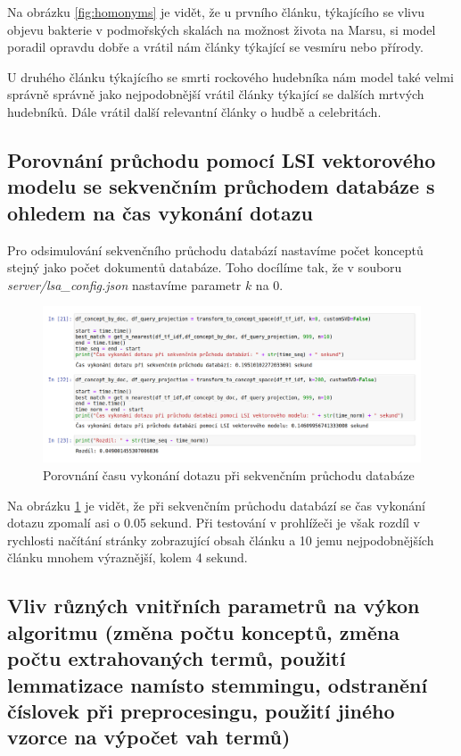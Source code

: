 \documentclass[11pt]{scrartcl} %
\begin{document}
Na obrázku \ref{fig:homonyms} je vidět, že u prvního článku, týkajícího se vlivu objevu bakterie v podmořských skalách na možnost života na Marsu, si model poradil opravdu dobře a vrátil nám články týkající se vesmíru nebo přírody.
\bigskip

U druhého článku týkajícího se smrti rockového hudebníka nám model také velmi správně správně jako nejpodobnější vrátil články týkající se dalších mrtvých hudebníků. Dále vrátil další relevantní články o hudbě a celebritách.

\subsection{Porovnání průchodu pomocí LSI vektorového modelu se sekvenčním průchodem databáze s ohledem na čas vykonání dotazu}

Pro odsimulování sekvenčního průchodu databází nastavíme počet konceptů stejný jako počet dokumentů databáze. Toho docílíme tak, že v souboru \emph{server/lsa\_config.json} nastavíme parametr $k$ na 0.

\begin{figure}[h] %
	\centering
	\includegraphics[width=1\columnwidth]{images/measure_time.png}
	\caption{Porovnání času vykonání dotazu při sekvenčním průchodu databáze}
	\label{fig:measure_time}
\end{figure}

\bigskip

Na obrázku \ref{fig:measure_time} je vidět, že při sekvenčním průchodu databází se čas vykonání dotazu zpomalí asi o
0.05 sekund. Při testování v prohlížeči je však rozdíl v rychlosti načítání stránky zobrazující obsah článku a 10 jemu nejpodobnějších článku mnohem výraznější, kolem 4 sekund.

\subsection{Vliv různých vnitřních parametrů na výkon algoritmu (změna počtu konceptů, změna počtu extrahovaných termů, použití lemmatizace namísto stemmingu, odstranění číslovek při preprocesingu, použití jiného vzorce na výpočet vah termů)}
\end{document}
